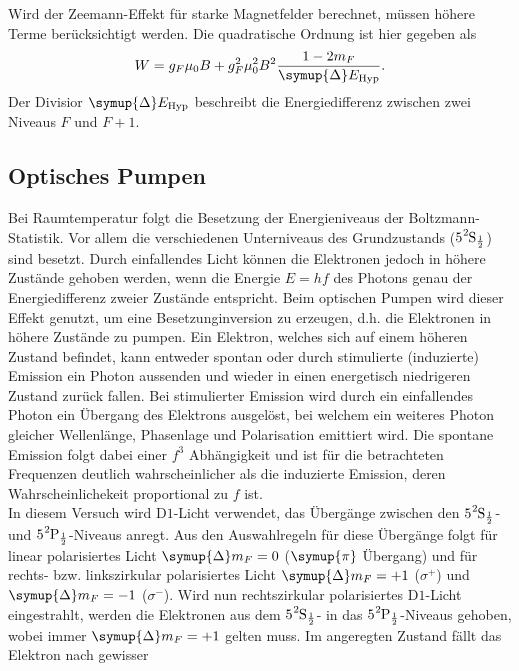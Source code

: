 Wird der Zeemann-Effekt für starke Magnetfelder berechnet, müssen höhere Terme berücksichtigt werden. Die quadratische Ordnung ist hier gegeben als
\begin{equation}
    W = g_F\mu_0B+ g_F^2\mu_0^2B^2\frac{1-2m_F}{\symup{\Delta}E_{\text{Hyp}}}.
    \label{eq:Zeemann^2}
\end{equation}
Der Divisior $\symup{\Delta}E_{\text{Hyp}}$ beschreibt die Energiedifferenz zwischen zwei Niveaus $F$ und $F+1$.

\subsection{Optisches Pumpen}
Bei Raumtemperatur folgt die Besetzung der Energieniveaus der Boltzmann-Statistik. Vor allem die verschiedenen Unterniveaus des Grundzustands 
($5\ce{^{2}\text{S}_{\frac{1}{2}}}$) sind besetzt. Durch einfallendes Licht können die Elektronen jedoch in höhere Zustände gehoben werden, wenn 
die Energie $E = hf$ des Photons genau der Energiedifferenz zweier Zustände entspricht. Beim optischen Pumpen wird dieser Effekt genutzt, um eine 
Besetzunginversion zu erzeugen, d.h. die Elektronen in höhere Zustände zu pumpen.
Ein Elektron, welches sich auf einem höheren Zustand befindet, kann entweder spontan oder durch stimulierte (induzierte) Emission ein Photon aussenden und 
wieder in einen energetisch niedrigeren Zustand zurück fallen. Bei stimulierter Emission wird durch ein einfallendes Photon ein Übergang des Elektrons
ausgelöst, bei welchem ein weiteres Photon gleicher Wellenlänge, Phasenlage und Polarisation emittiert wird.
Die spontane Emission folgt dabei einer $f^3$ Abhängigkeit und ist für die betrachteten Frequenzen 
deutlich wahrscheinlicher als die induzierte Emission, deren Wahrscheinlichekeit proportional zu $f$ ist. \\
In diesem Versuch wird $\text{D}1$-Licht verwendet, das Übergänge zwischen den $5\ce{^{2}\text{S}_{\frac{1}{2}}}$- und 
$5\ce{^{2}\text{P}_{\frac{1}{2}}}$-Niveaus anregt. Aus den Auswahlregeln für diese Übergänge folgt für linear polarisiertes Licht $\symup{\Delta}m_F = 0$
($\symup{\pi}$ Übergang) und für rechts- bzw. linkszirkular polarisiertes Licht $\symup{\Delta}m_F = +1$ ($\sigma^+$) und $\symup{\Delta}m_F = -1$ ($\sigma^-$).
Wird nun rechtszirkular polarisiertes $\text{D}1$-Licht eingestrahlt, werden die Elektronen aus dem $5\ce{^{2}\text{S}_{\frac{1}{2}}}$- in das 
$5\ce{^{2}\text{P}_{\frac{1}{2}}}$-Niveaus gehoben, wobei immer  $\symup{\Delta}m_F = +1$ gelten muss. Im angeregten Zustand fällt das Elektron nach gewisser

